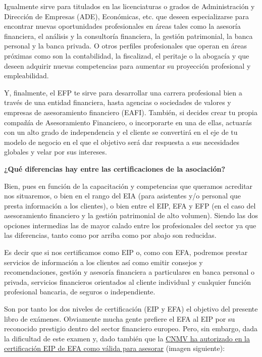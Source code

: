 \documentclass[
  letterpaper,
  DIV=11,
  numbers=noendperiod]{scrreprt}
\begin{document}
Igualmente sirve para titulados en las licenciaturas o grados de
Administración y Dirección de Empresas (ADE), Económicas, etc. que
deseen especializarse para encontrar nuevas oportunidades profesionales
en áreas tales como la asesoría financiera, el análisis y la consultoría
financiera, la gestión patrimonial, la banca personal y la banca
privada. O otros perfiles profesionales que operan en áreas próximas
como son la contabilidad, la fiscalizad, el peritaje o la abogacía y que
deseen adquirir nuevas competencias para aumentar su proyección
profesional y empleabilidad.

Y, finalmente, el EFP te sirve para desarrollar una carrera profesional
bien a través de una entidad financiera, hasta agencias o sociedades de
valores y empresas de asesoramiento financiero (EAFI). También, si
decides crear tu propia compañía de Asesoramiento Financiero, o
incorporarte en una de ellas, actuarás con un alto grado de
independencia y el cliente se convertirá en el eje de tu modelo de
negocio en el que el objetivo será dar respuesta a sus necesidades
globales y velar por sus intereses.

\textbf{¿Qué diferencias hay entre las certificaciones de la
asociación?}

Bien, pues en función de la capacitación y competencias que queramos
acreditar nos situaremos, o bien en el rango del EIA (para asistentes
y/o personal que presta información a los clientes), o bien entre el
EIP, EFA y EFP (en el caso del asesoramiento financiero y la gestión
patrimonial de alto volumen). Siendo las dos opciones intermedias las de
mayor calado entre los profesionales del sector ya que las diferencias,
tanto como por arriba como por abajo son reducidas.

Es decir que si nos certificamos como EIP o, como con EFA, podremos
prestar servicios de información a los clientes así como emitir consejos
y recomendaciones, gestión y asesoría financiera a particulares en banca
personal o privada, servicios financieros orientados al cliente
individual y cualquier función profesional bancaria, de seguros o
independiente.

Son por tanto los dos niveles de certificación (EIP y EFA) el objetivo
del presente libro de exámenes. Obviamente mucha gente prefiere el EFA
al EIP por su reconocido prestigio dentro del sector financiero europeo.
Pero, sin embargo, dada la dificultad de este examen y, dado también que
la
\href{http://cnmv.es/Docportal/Legislacion/Titulos/ListadoTitulos.pdf}{CNMV
ha autorizado en la certificación EIP de EFA como válida para asesorar}
(imagen siguiente):
\end{document}
